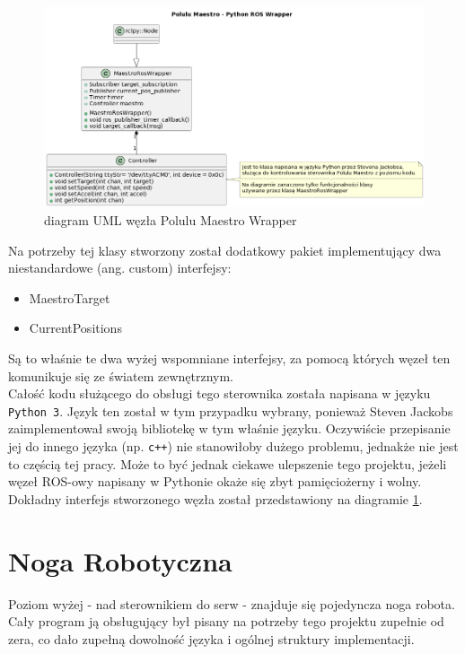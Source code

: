 \begin{figure}[h!]
\includegraphics[width=\textwidth]{UML_diagrams/MaestroWrapper.png}
\centering
\caption{diagram UML węzła Polulu Maestro Wrapper}
\label{UML_maestro}
\end{figure}

Na potrzeby tej klasy stworzony został dodatkowy pakiet implementujący dwa niestandardowe (ang. custom) interfejsy:
\begin{itemize}[noitemsep]
\item MaestroTarget
\item CurrentPositions
\end{itemize}
Są to właśnie te dwa wyżej wspomniane interfejsy, za pomocą których węzeł ten komunikuje się ze światem zewnętrznym.\\

Całość kodu służącego do obsługi tego sterownika została napisana w języku \texttt{Python 3}. Język ten został w tym przypadku wybrany, ponieważ Steven Jackobs zaimplementował swoją bibliotekę w tym właśnie języku. Oczywiście przepisanie jej do innego języka (np. \texttt{c++}) nie stanowiłoby dużego problemu, jednakże nie jest to częścią tej pracy. Może to być jednak ciekawe ulepszenie tego projektu, jeżeli węzeł ROS-owy napisany w Pythonie okaże się zbyt pamięciożerny i wolny. Dokładny interfejs stworzonego węzła został przedstawiony na diagramie \ref{UML_maestro}.



\section{Noga Robotyczna}
Poziom wyżej - nad sterownikiem do serw - znajduje się pojedyncza noga robota. Cały program ją obsługujący był pisany na potrzeby tego projektu zupełnie od zera, co dało zupełną dowolność języka i ogólnej struktury implementacji. \\

